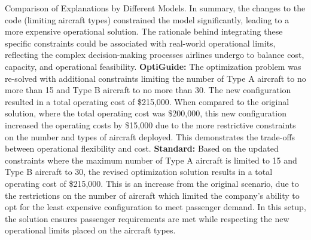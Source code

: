 \begin{figure*}[ht]
\begin{AIbox}{Comparison of Explanations by Different Models.}
{In summary, the changes to the code (limiting aircraft types) constrained the model significantly, leading to a more expensive operational solution. The rationale behind integrating these specific constraints could be associated with real-world operational limits, reflecting the complex decision-making processes airlines undergo to balance cost, capacity, and operational feasibility.
}
\tcbline
{\bf OptiGuide:}
{\footnotesize
The optimization problem was re-solved with additional constraints limiting the number of Type A aircraft to no more than 15 and Type B aircraft to no more than 30. The new configuration resulted in a total operating cost of \$215,000. When compared to the original solution, where the total operating cost was \$200,000, this new configuration increased the operating costs by \$15,000 due to the more restrictive constraints on the number and types of aircraft deployed. This demonstrates the trade-offs between operational flexibility and cost.
}
\tcbline
{\bf Standard:}
{\footnotesize
Based on the updated constraints where the maximum number of Type A aircraft is limited to 15 and Type B aircraft to 30, the revised optimization solution results in a total operating cost of \$215,000. This is an increase from the original scenario, due to the restrictions on the number of aircraft which limited the company's ability to opt for the least expensive configuration to meet passenger demand. In this setup, the solution ensures passenger requirements are met while respecting the new operational limits placed on the aircraft types.
}
\end{AIbox}
\caption{An example illustrating explanations generated by different models.}
\vspace{-10pt}
\label{fig:explaiations_vs_appendix}
\end{figure*}



